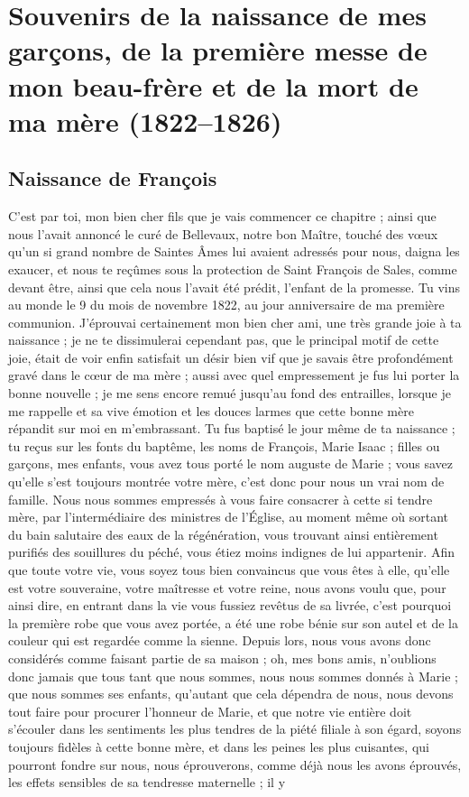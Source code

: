 \documentclass[11pt,a4paper]{report}
\begin{document}
\chapter{Souvenirs de la naissance de mes garçons, de la première messe de mon beau-frère et de la mort de ma mère (1822--1826)}

\section*{Naissance de François}

C'est par toi, mon bien cher fils que je vais commencer ce chapitre ; ainsi que nous l'avait annoncé le curé de Bellevaux, notre bon Maître, touché des vœux qu'un si grand nombre de Saintes Âmes lui avaient adressés pour nous, daigna les exaucer, et nous te reçûmes sous la protection de Saint François de Sales, comme devant être, ainsi que cela nous l'avait été prédit, l'enfant de la promesse. Tu vins au monde le 9 du mois de novembre 1822, au jour anniversaire de ma première communion. J'éprouvai certainement mon bien cher ami, une très grande joie à ta naissance ; je ne te dissimulerai cependant pas, que le principal motif de cette joie, était de voir enfin satisfait un désir bien vif que je savais être profondément gravé dans le cœur de ma mère ; aussi avec quel empressement je fus lui porter la bonne nouvelle ; je me sens encore remué jusqu'au fond des entrailles, lorsque je me rappelle et sa vive émotion et les douces larmes que cette bonne mère répandit sur moi en m'embrassant. Tu fus baptisé le jour même de ta naissance ; tu reçus sur les fonts du baptême, les noms de François, Marie Isaac ; filles ou garçons, mes enfants, vous avez tous porté le nom auguste de Marie ; vous savez qu'elle s'est toujours montrée votre mère, c'est donc pour nous un vrai nom de famille. Nous nous sommes empressés à vous faire consacrer à cette si tendre mère, par l'intermédiaire des ministres de l'Église, au moment même où sortant du bain salutaire des eaux de la régénération, vous trouvant ainsi entièrement purifiés des souillures du péché, vous étiez moins indignes de lui appartenir. Afin que toute votre vie, vous soyez tous bien convaincus que vous êtes à elle, qu'elle est votre souveraine, votre maîtresse et votre reine, nous avons voulu que, pour ainsi dire, en entrant dans la vie vous fussiez revêtus de sa livrée, c'est pourquoi la première robe que vous avez portée, a été une robe bénie sur son autel et de la couleur qui est regardée comme la sienne. Depuis lors, nous vous avons donc considérés comme faisant partie de sa maison ; oh, mes bons amis, n'oublions donc jamais que tous tant que nous sommes, nous nous sommes donnés à Marie ; que nous sommes ses enfants, qu'autant que cela dépendra de nous, nous devons tout faire pour procurer l'honneur de Marie, et que notre vie entière doit s'écouler dans les sentiments les plus tendres de la piété filiale à son égard, soyons toujours fidèles à cette bonne mère, et dans les peines les plus cuisantes, qui pourront fondre sur nous, nous éprouverons, comme déjà nous les avons éprouvés, les effets sensibles de sa tendresse maternelle ; il y 
\end{document}

